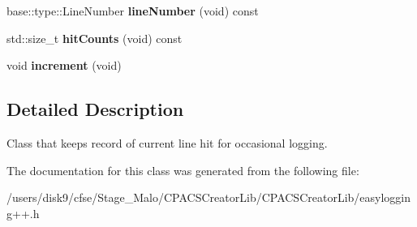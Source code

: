 \begin{DoxyCompactItemize}
\item 
\hypertarget{classel_1_1base_1_1HitCounter_a6a0518496739359160b4aa541d66d9f8}{base\-::type\-::\-Line\-Number {\bfseries line\-Number} (void) const }\label{classel_1_1base_1_1HitCounter_a6a0518496739359160b4aa541d66d9f8}

\item 
\hypertarget{classel_1_1base_1_1HitCounter_a3df3a285c91b5eb690be48893d677e94}{std\-::size\-\_\-t {\bfseries hit\-Counts} (void) const }\label{classel_1_1base_1_1HitCounter_a3df3a285c91b5eb690be48893d677e94}

\item 
\hypertarget{classel_1_1base_1_1HitCounter_ae2d7709a89362019195761416d510911}{void {\bfseries increment} (void)}\label{classel_1_1base_1_1HitCounter_ae2d7709a89362019195761416d510911}

\end{DoxyCompactItemize}


\subsection{Detailed Description}
Class that keeps record of current line hit for occasional logging. 

The documentation for this class was generated from the following file\-:\begin{DoxyCompactItemize}
\item 
/users/disk9/cfse/\-Stage\-\_\-\-Malo/\-C\-P\-A\-C\-S\-Creator\-Lib/\-C\-P\-A\-C\-S\-Creator\-Lib/easylogging++.\-h\end{DoxyCompactItemize}

